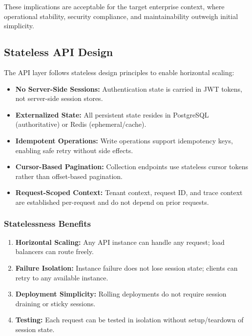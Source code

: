 \documentclass[a4paper,twoside]{sapthesis}
\begin{document}
These implications are acceptable for the target enterprise context, where operational stability, security compliance, and maintainability outweigh initial simplicity.

\subsection{Stateless API Design}
\label{subsec:stateless-api}

The API layer follows stateless design principles to enable horizontal scaling:

\begin{itemize}
    \item \textbf{No Server-Side Sessions:} Authentication state is carried in JWT tokens, not server-side session stores.
    
    \item \textbf{Externalized State:} All persistent state resides in PostgreSQL (authoritative) or Redis (ephemeral/cache).
    
    \item \textbf{Idempotent Operations:} Write operations support idempotency keys, enabling safe retry without side effects.
    
    \item \textbf{Cursor-Based Pagination:} Collection endpoints use stateless cursor tokens rather than offset-based pagination.
    
    \item \textbf{Request-Scoped Context:} Tenant context, request ID, and trace context are established per-request and do not depend on prior requests.
\end{itemize}

\subsubsection{Statelessness Benefits}

\begin{enumerate}
    \item \textbf{Horizontal Scaling:} Any API instance can handle any request; load balancers can route freely.
    
    \item \textbf{Failure Isolation:} Instance failure does not lose session state; clients can retry to any available instance.
    
    \item \textbf{Deployment Simplicity:} Rolling deployments do not require session draining or sticky sessions.
    
    \item \textbf{Testing:} Each request can be tested in isolation without setup/teardown of session state.
\end{enumerate}
\end{document}
